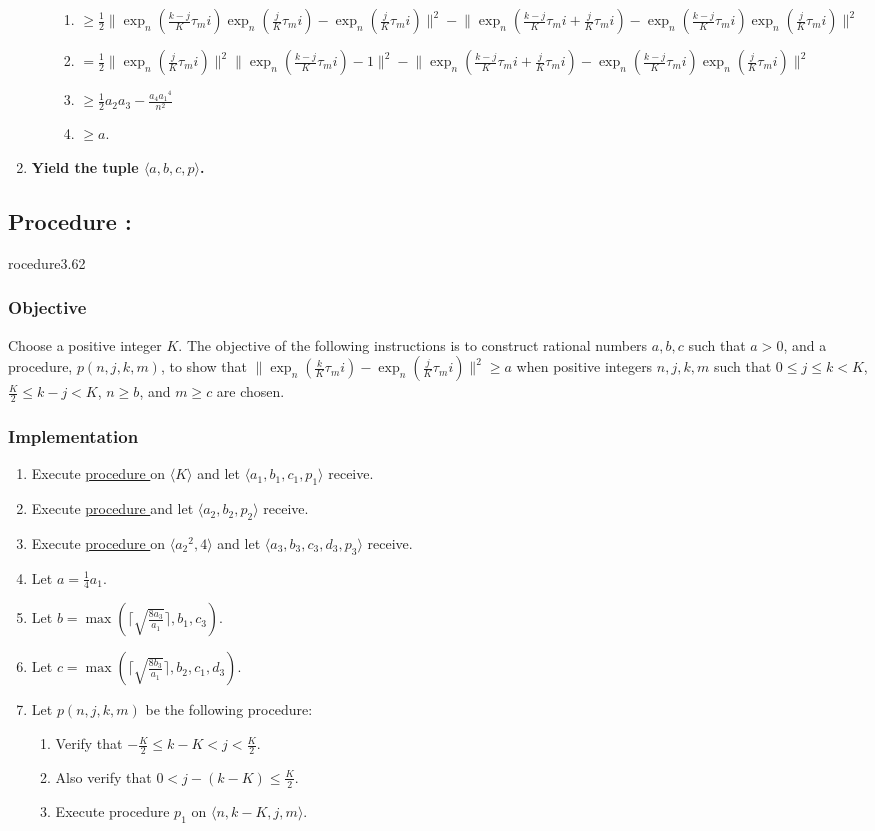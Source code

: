\documentclass{article}
\newcounter{procedure}[part]
\newcommand{\procedure}[1]{\subsection*{Procedure \thepart:\theprocedure}\label{sec:procedure #1}\global\expandafter\edef\csname procedure#1\endcsname{\thepart:\theprocedure}\addtocounter{procedure}{1}}
\newcommand{\objective}{\subsubsection*{Objective}}
\newcommand{\implementation}{\subsubsection*{Implementation}}
\newcommand{\procedurehr}[1]{\hyperref[sec:procedure #1]{procedure \expandafter\csname procedure#1\endcsname}}
\begin{document}
\begin{multicols}{2}
\begin{enumerate}
\begin{enumerate}
\begin{enumerate}
							\item $\ge\frac{1}{2}\lVert\exp_n(\frac{k-j}{K}\tau_mi)\exp_n(\frac{j}{K}\tau_mi)-\exp_n(\frac{j}{K}\tau_mi)\rVert^2-\lVert\exp_n(\frac{k-j}{K}\tau_mi+\frac{j}{K}\tau_mi)-\exp_n(\frac{k-j}{K}\tau_mi)\exp_n(\frac{j}{K}\tau_mi)\rVert^2$
							\item $=\frac{1}{2}\lVert\exp_n(\frac{j}{K}\tau_mi)\rVert^2\lVert\exp_n(\frac{k-j}{K}\tau_mi)-1\rVert^2-\lVert\exp_n(\frac{k-j}{K}\tau_mi+\frac{j}{K}\tau_mi)-\exp_n(\frac{k-j}{K}\tau_mi)\exp_n(\frac{j}{K}\tau_mi)\rVert^2$
							\item $\ge\frac{1}{2}a_2a_3-\frac{a_4{a_1}^4}{n^2}$
							\item $\ge a$.
						\end{enumerate}
					\end{enumerate}
					\item \textbf{Yield the tuple $\langle a,b,c,p\rangle$.}
				\end{enumerate}
		\procedure{3.62}
			\objective
				Choose a positive integer $K$. The objective of the following instructions is to construct rational numbers $a,b,c$ such that $a>0$, and a procedure, $p(n,j,k,m)$, to show that $\lVert\exp_n(\frac{k}{K}\tau_mi)-\exp_n(\frac{j}{K}\tau_mi)\rVert^2\ge a$ when positive integers $n,j,k,m$ such that $0\le j\le k<K$, $\frac{K}{2}\le k-j<K$, $n\ge b$, and $m\ge c$ are chosen.
			\implementation
				\begin{enumerate}
					\item Execute \procedurehr{3.61} on $\langle K\rangle$ and let $\langle a_1,b_1,c_1,p_1\rangle$ receive.
					\item Execute \procedurehr{3.50} and let $\langle a_2,b_2,p_2\rangle$ receive.
					\item Execute \procedurehr{3.59} on $\langle {a_2}^2,4\rangle$ and let $\langle a_3,b_3,c_3,d_3,p_3\rangle$ receive.
					\item Let $a=\frac{1}{4}a_1$.
					\item Let $b=\max(\lceil\sqrt{\frac{8a_3}{a_1}}\rceil,b_1,c_3)$.
					\item Let $c=\max(\lceil\sqrt{\frac{8b_3}{a_1}}\rceil,b_2,c_1,d_3)$.
					\item Let $p(n,j,k,m)$ be the following procedure:
					\begin{enumerate}
						\item Verify that $-\frac{K}{2}\le k-K<j<\frac{K}{2}$.
						\item Also verify that $0<j-(k-K)\le\frac{K}{2}$.
						\item Execute procedure $p_1$ on $\langle n,k-K,j,m\rangle$.

\end{enumerate}
\end{enumerate}
\end{multicols}
\end{document}
